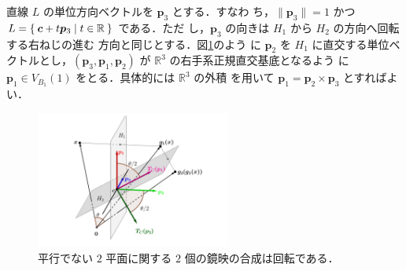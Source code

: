 \documentclass[11pt, uplatex, dvipdfmx, titlepage]{jsarticle}
\makeatletter
\renewenvironment{proof}[1][\proofname]{\par
  \pushQED{\qed}%
  \normalfont \topsep6\p@\@plus6\p@\relax
  \trivlist
  \item[\hskip\labelsep
         \bfseries
    {#1}]\ignorespaces
}{%
  \popQED\endtrivlist\@endpefalse
}
\theoremstyle{definition}
\renewcommand{\proofname}{\textbf{証明}}
\makeatother
\begin{document}
\begin{proof}
  
  直線 $L$ の単位方向ベクトルを $\bm{p}_3$ とする．すなわ
  ち，$\|\bm{p}_3\|=1$
  かつ$L=\Set{\bm{c} + t \bm{p}_3 | t \in \mathbb{R}}$ である．ただ
  し，$\bm{p}_3$ の向きは $H_1$ から $H_2$ の方向へ回転する右ねじの進む
  方向と同じとする．図\ref{fig:rotation3ref}のよう
  に $\bm{p}_2$ を $H_1$ に直交する単位ベクトルとし，$(\bm{p}_3,
  \bm{p}_1, \bm{p}_2)$ が $\mathbb{R}^3$ の右手系正規直交基底となるよう
  に $\bm{p}_1 \in V_{B_1}(1)$ をとる．具体的には $\mathbb{R}^3$ の外積
  を用いて $\bm{p}_1 = \bm{p}_2 \times \bm{p}_3$ とすればよい．
  \begin{figure}[h]
    \centering
    \includegraphics[height=4.5cm]{pictures/rotation3ref.pdf}
    \caption{平行でない $2$ 平面に関する $2$ 個の鏡映の合成は回転である．}
    \label{fig:rotation3ref}
  \end{figure}


\end{proof}
\end{document}
